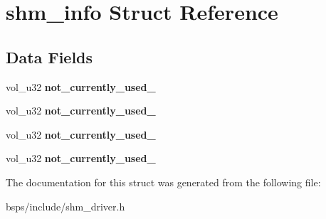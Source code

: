 \hypertarget{structshm__info}{}\section{shm\+\_\+info Struct Reference}
\label{structshm__info}
\subsection*{Data Fields}
\begin{DoxyCompactItemize}
\item 
\mbox{\label{structshm__info_a6a1df731e7e3e89e07377c9b53e8525b}} 
vol\+\_\+u32 {\bfseries not\+\_\+currently\+\_\+used\+\_}
\item 
\mbox{\label{structshm__info_a370a473340cfb3bee9b81e0df8cb496f}} 
vol\+\_\+u32 {\bfseries not\+\_\+currently\+\_\+used\+\_}
\item 
\mbox{\label{structshm__info_a0a0df6d3ba62e5de17ade3cd97b51682}} 
vol\+\_\+u32 {\bfseries not\+\_\+currently\+\_\+used\+\_}
\item 
\mbox{\label{structshm__info_acd1727d785407173aa98e05c497c4eaf}} 
vol\+\_\+u32 {\bfseries not\+\_\+currently\+\_\+used\+\_}
\end{DoxyCompactItemize}


The documentation for this struct was generated from the following file\+:\begin{DoxyCompactItemize}
\item 
bsps/include/shm\+\_\+driver.\+h\end{DoxyCompactItemize}
